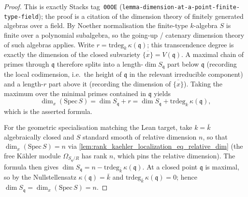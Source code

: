 \begin{proof}
  This is exactly Stacks tag~\texttt{00OE}
  (\texttt{lemma-dimension-at-a-point-finite-type-field}); the proof is a
  citation of the dimension theory of finitely generated algebras over a
  field. By Noether normalisation the finite-type \(k\)-algebra \(S\) is
  finite over a polynomial subalgebra, so the going-up / catenary
  dimension theory of such algebras applies. Write
  \(r = \mathrm{trdeg}_k\,\kappa(\mathfrak q)\); this transcendence
  degree is exactly the dimension of the closed subvariety
  \(\overline{\{x\}} = V(\mathfrak q)\). A maximal chain of primes
  through \(\mathfrak q\) therefore splits into a
  length-\(\dim S_{\mathfrak q}\) part below \(\mathfrak q\) (recording
  the local codimension, i.e.\ the height of \(\mathfrak q\) in the
  relevant irreducible component) and a length-\(r\) part above it
  (recording the dimension of \(\overline{\{x\}}\)). Taking the maximum
  over the minimal primes contained in \(\mathfrak q\) yields
  \[
    \dim_x(\mathrm{Spec}\,S) = \dim S_{\mathfrak q} + r
    = \dim S_{\mathfrak q} + \mathrm{trdeg}_k\,\kappa(\mathfrak q),
  \]
  which is the asserted formula.

  For the geometric specialisation matching the Lean target, take
  \(k = \bar k\) algebraically closed and \(S\) standard smooth of
  relative dimension \(n\), so that \(\dim_x(\mathrm{Spec}\,S) = n\) via
  \cref{lem:rank_kaehler_localization_eq_relative_dim} (the free
  K\"ahler module \(\Omega_{S_{\mathfrak q}/R}\) has rank \(n\), which
  pins the relative dimension). The formula then gives
  \(\dim S_{\mathfrak q} = n - \mathrm{trdeg}_{\bar k}\,\kappa(\mathfrak
  q)\). At a closed point \(\mathfrak q\) is maximal, so by the
  Nullstellensatz \(\kappa(\mathfrak q) = \bar k\) and
  \(\mathrm{trdeg}_{\bar k}\,\kappa(\mathfrak q) = 0\); hence
  \(\dim S_{\mathfrak q} = \dim_x(\mathrm{Spec}\,S) = n\).
\end{proof}

